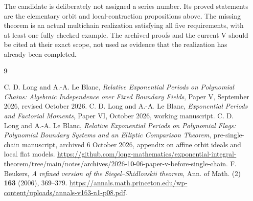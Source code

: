\documentclass[11pt]{article}
\numberwithin{equation}{section}
\theoremstyle{definition}
\theoremstyle{remark}
\begin{document}
The candidate is deliberately not assigned a series number. Its proved
statements are the elementary orbit and local-contraction propositions
above. The missing theorem is an actual multichain realization satisfying
all five requirements, with at least one fully checked example. The
archived proofs and the current V should be cited at their exact scope,
not used as evidence that the realization has already been completed.

\begin{thebibliography}{9}
\raggedright
{} C. D. Long and A.-A. Le Blanc, \emph{Relative Exponential
Periods on Polynomial Chains: Algebraic Independence over Fixed Boundary
Fields}, Paper V, September 2026, revised October 2026.
 C. D. Long and A.-A. Le Blanc, \emph{Exponential Periods
and Factorial Moments}, Paper VI, October 2026, working manuscript.
 C. D. Long and A.-A. Le Blanc, \emph{Relative Exponential
Periods on Polynomial Flags: Polynomial Boundary Systems and an Elliptic
Comparison Theorem}, pre-single-chain manuscript, archived 6 October 2026,
appendix on affine orbit ideals and local flat models.
\url{https://github.com/long-mathematics/exponential-integral-theorem/tree/main/notes/archives/2026-10-06-paper-v-before-single-chain}.
 F. Beukers, \emph{A refined version of the
Siegel--Shidlovskii theorem}, Ann. of Math. (2) \textbf{163} (2006), 369--379.
\url{https://annals.math.princeton.edu/wp-content/uploads/annals-v163-n1-p08.pdf}.
\end{thebibliography}
\end{document}
